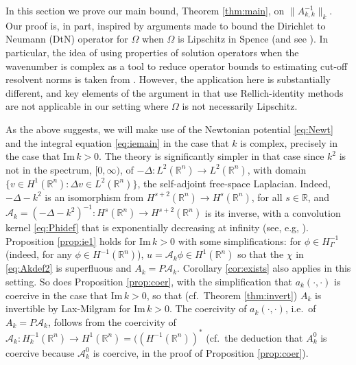 \documentclass{birkjour}
\theoremstyle{definition}
\theoremstyle{remark}
\numberwithin{equation}{section}
\newcommand{\R}{\mathbb{R}}
\newcommand{\cA}{\mathcal{A}}
\begin{document}
In this section we prove our main bound, Theorem \ref{thm:main}, on $\|A_{k,k}^{-1}\|_k$. Our proof is, in part, inspired by arguments made to bound the Dirichlet to Neumann (DtN) operator for $\Omega$ when $\Omega$ is Lipschitz in Spence \cite[\S3]{spence2014wavenumber} (and see \cite[Lemma 4.2]{chandler2020high}). %
In particular, the idea of using properties of solution operators when the wavenumber is complex as a tool to reduce operator bounds to estimating cut-off resolvent norms is taken from  \cite[\S3]{spence2014wavenumber}.
However, the application here is substantially different, and key elements of the argument in \cite[\S3]{spence2014wavenumber} that use Rellich-identity methods are not applicable in our setting where $\Omega$ is not necessarily Lipschitz.

As the above suggests, we will make use of the Newtonian potential \eqref{eq:Newt} and the integral equation \eqref{eq:iemain} in the case that $k$ is complex, precisely in the case that 
$\mathrm{Im}\, k>0$. The theory is significantly simpler in that case since $k^2$ is not in the spectrum, $[0,\infty)$, of  $-\Delta:L^2(\R^n)\to L^2(\R^n)$, with domain $\{v\in H^1(\R^n):\Delta v\in L^2(\R^n)\}$, the self-adjoint free-space Laplacian. Indeed, $-\Delta - k^2$ is an isomorphism from $H^{s+2}(\R^n)\to H^s(\R^n)$, for all $s\in \R$, and $\cA_k = (-\Delta-k^2)^{-1}:H^s(\R^n)\to H^{s+2}(\R^n)$ is its inverse, with a convolution kernel \eqref{eq:Phidef} that is exponentially decreasing at infinity (see, e.g,  \cite[p.~282]{mclean2000strongly}). Proposition \ref{prop:ie1} holds for $\mathrm{Im}\, k>0$ with some simplifications: for $\phi\in H^{-1}_\Gamma$ (indeed, for any $\phi\in H^{-1}(\R^n)$), $u=\cA_k\phi\in H^1(\R^n)$ so that the $\chi$ in \eqref{eq:Akdef2} is superfluous and $A_k = P\cA_k$. Corollary \ref{cor:exists} also applies in this setting. So does Proposition \ref{prop:coer}, with the simplification that $a_k(\cdot,\cdot)$ is coercive in the case that $\mathrm{Im}\, k>0$, so that (cf.~Theorem \ref{thm:invert}) $A_k$ is invertible by Lax-Milgram for $\mathrm{Im}\, k>0$. The coercivity of $a_k(\cdot,\cdot)$, i.e.~of $A_k=P \cA_k$, follows from the coercivity of $\cA_k:H^{-1}_k(\R^n)\to H^1(\R^n)=((H^{-1}(\R^n))^*$  (cf.~the deduction that $A_k^0$ is coercive because $\cA_k^0$ is coercive, in the proof of Proposition \ref{prop:coer}). 
\end{document}

